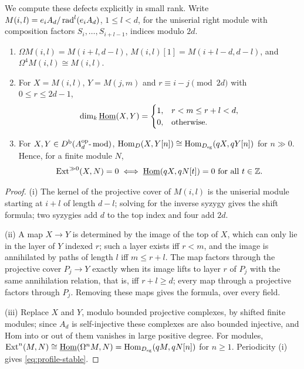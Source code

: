 We compute these defects explicitly in small rank.  Write \(M(i,l)=e_iA_d/\operatorname{rad}^l(e_iA_d)\), \(1\le l<d\), for the uniserial right module with composition factors \(S_i,\dots,S_{i+l-1}\), indices modulo \(2d\).

\begin{lemma}\label{lem:stable-hom}
\begin{enumerate}[label=\textup{(\roman*)}]
\item \(\Omega M(i,l)=M(i+l,d-l)\), \(M(i,l)[1]=M(i+l-d,d-l)\), and \(\Omega^4M(i,l)\cong M(i,l)\).
\item For \(X=M(i,l)\), \(Y=M(j,m)\) and \(r\equiv i-j\pmod{2d}\) with \(0\le r\le 2d-1\),
\[
 \dim_k\underline{\operatorname{Hom}}(X,Y)=\begin{cases}1,&r<m\le r+l<d,\\0,&\text{otherwise.}\end{cases}
\]
\item For \(X,Y\in D^{\mathrm b}(A_d^{\mathrm{op}}\text{-}\operatorname{mod})\), \(\operatorname{Hom}_{D}(X,Y[n])\cong\operatorname{Hom}_{D_{\mathrm{sg}}}(qX,qY[n])\) for \(n\gg0\).  Hence, for a finite module \(N\),
\begin{equation}\label{eq:profile-stable}
 \operatorname{Ext}^{\gg0}(X,N)=0\iff\underline{\operatorname{Hom}}(qX,qN[t])=0\ \text{for all }t\in\mathbb Z .
\end{equation}
\end{enumerate}
\end{lemma}

\begin{proof}
(i) The kernel of the projective cover of \(M(i,l)\) is the uniserial module starting at \(i+l\) of length \(d-l\); solving for the inverse syzygy gives the shift formula; two syzygies add \(d\) to the top index and four add \(2d\).

(ii) A map \(X\to Y\) is determined by the image of the top of \(X\), which can only lie in the layer of \(Y\) indexed \(r\); such a layer exists iff \(r<m\), and the image is annihilated by paths of length \(l\) iff \(m\le r+l\).  The map factors through the projective cover \(P_j\to Y\) exactly when its image lifts to layer \(r\) of \(P_j\) with the same annihilation relation, that is, iff \(r+l\ge d\); every map through a projective factors through \(P_j\).  Removing these maps gives the formula, over every field.

(iii) Replace \(X\) and \(Y\), modulo bounded projective complexes, by shifted finite modules; since \(A_d\) is self-injective these complexes are also bounded injective, and Hom into or out of them vanishes in large positive degree.  For modules, \(\operatorname{Ext}^n(M,N)\cong\underline{\operatorname{Hom}}(\Omega^nM,N)=\operatorname{Hom}_{D_{\mathrm{sg}}}(qM,qN[n])\) for \(n\ge1\).  Periodicity (i) gives \eqref{eq:profile-stable}.
\end{proof}

